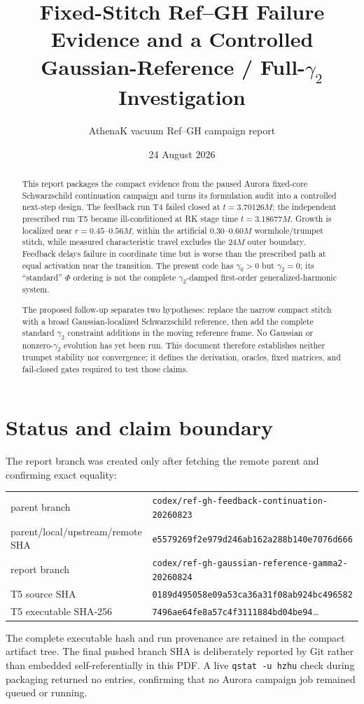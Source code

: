 \documentclass[11pt]{article}
\title{Fixed-Stitch Ref--GH Failure Evidence and a Controlled\\
Gaussian-Reference / Full-$\gamma_2$ Investigation}
\author{AthenaK vacuum Ref--GH campaign report}
\date{24 August 2026}
\newcommand{\code}[1]{\texttt{#1}}
\begin{document}
\maketitle

\begin{abstract}
This report packages the compact evidence from the paused Aurora fixed-core
Schwarzschild continuation campaign and turns its formulation audit into a
controlled next-step design.  The feedback run T4 failed closed at
$t=3.70126M$; the independent prescribed run T5 became ill-conditioned at RK
stage time $t=3.18677M$.  Growth is localized near $r=0.45$--$0.56M$, within
the artificial $0.30$--$0.60M$ wormhole/trumpet stitch, while measured
characteristic travel excludes the $24M$ outer boundary.  Feedback delays
failure in coordinate time but is worse than the prescribed path at equal
activation near the transition.  The present code has $\gamma_0>0$ but
$\gamma_2=0$; its ``standard'' $\Phi$ ordering is not the complete
$\gamma_2$-damped first-order generalized-harmonic system.

The proposed follow-up separates two hypotheses: replace the narrow compact
stitch with a broad Gaussian-localized Schwarzschild reference, then add the
complete standard $\gamma_2$ constraint additions in the moving reference
frame.  No Gaussian or nonzero-$\gamma_2$ evolution has yet been run.  This
document therefore establishes neither trumpet stability nor convergence; it
defines the derivation, oracles, fixed matrices, and fail-closed gates required
to test those claims.
\end{abstract}

\section{Status and claim boundary}

The report branch was created only after fetching the remote parent and
confirming exact equality:
\begin{center}
\begin{tabular}{ll}
\toprule
parent branch & \code{codex/ref-gh-feedback-continuation-20260823} \\
parent/local/upstream/remote SHA & \code{e5579269f2e979d246ab162a288b140e7076d666} \\
report branch & \code{codex/ref-gh-gaussian-reference-gamma2-20260824} \\
T5 source SHA & \code{0189d495058e09a53ca36a31f08ab924bc496582} \\
T5 executable SHA-256 & \code{7496ae64fe8a57c4f3111884bd04be94}\ldots \\
\bottomrule
\end{tabular}
\end{center}
The complete executable hash and run provenance are retained in the compact
artifact tree.  The final pushed branch SHA is deliberately reported by Git
rather than embedded self-referentially in this PDF.  A live
\code{qstat -u hzhu} check during packaging returned no entries, confirming
that no Aurora campaign job remained queued or running.
\end{document}
